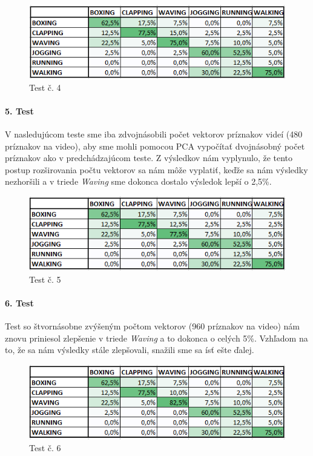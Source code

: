 \begin{figure}[H]
  \centering
  \includegraphics[width=14cm]{img/test6PCA1g.png}
  \caption{Test č. 4}
  \label{test4}
\end{figure} 

\paragraph{5. Test} 
V nasledujúcom teste sme iba zdvojnásobili počet vektorov príznakov videí (480 príznakov na video), aby sme mohli pomocou PCA vypočítať dvojnásobný počet príznakov ako v predchádzajúcom teste. Z výsledkov nám vyplynulo, že tento postup rozširovania počtu vektorov sa nám môže vyplatiť, keďže sa nám výsledky nezhoršili a v triede \textit{Waving} sme dokonca dostalo výsledok lepší o 2,5\%. 
\begin{figure}[H]
  \centering
  \includegraphics[width=14cm]{img/test6PCA2g.png}
  \caption{Test č. 5}
  \label{test5}
\end{figure} 

\paragraph{6. Test} 
Test so štvornásobne zvýšeným počtom vektorov (960 príznakov na video) nám znovu priniesol zlepšenie v triede \textit{Waving} a to dokonca o celých 5\%. Vzhľadom na to, že sa nám výsledky stále zlepšovali, snažili sme sa ísť ešte ďalej.
\begin{figure}[H]
  \centering
  \includegraphics[width=14cm]{img/test6PCA4g.png}
  \caption{Test č. 6}
  \label{test6}
\end{figure} 

